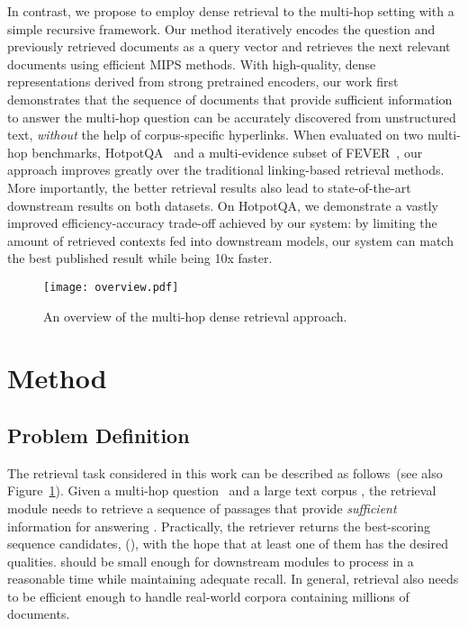 \documentclass{article} \usepackage{iclr2021_conference,times}
\begin{document}
In contrast, we propose to employ dense retrieval to the multi-hop setting with a simple recursive framework.
Our method iteratively encodes the question and previously retrieved documents as a query vector and retrieves the next relevant documents using efficient MIPS methods. 
With high-quality, dense representations derived from strong pretrained encoders, our work first demonstrates that the sequence of documents that provide sufficient information to answer the multi-hop question can be 
accurately discovered from unstructured text, \emph{without} the help of corpus-specific hyperlinks. 
When evaluated on two multi-hop benchmarks, HotpotQA~\citep{HotpotQA} and a multi-evidence subset of FEVER~\citep{FEVER}, our approach improves greatly over the traditional linking-based retrieval methods. More importantly, the better retrieval results also lead to state-of-the-art downstream results on both datasets. On HotpotQA, we demonstrate a vastly improved efficiency-accuracy trade-off achieved by our system: by limiting the amount of retrieved contexts fed into downstream models, our system can match the best published result while being 10x faster.



\begin{figure}[t]
\vspace{-0.2in}
\texttt{[image: overview.pdf]}
\vspace{-0.2in}
 \caption{An overview of the multi-hop dense retrieval approach.}
\vspace{-0.2in}
\label{fig:example}
\end{figure}



\section{Method}

\subsection{Problem Definition} 






The retrieval task considered in this work can be described as follows~(see also Figure~\ref{fig:example}). 
Given a multi-hop question~ and a large text corpus , the retrieval module needs to retrieve a sequence of passages  that provide \emph{sufficient} information for answering .  
Practically, the retriever returns the  best-scoring sequence candidates,  (), with the hope that at least one of them has the desired qualities. 
 should be small enough for downstream modules to process in a reasonable time while maintaining adequate recall.
In general, retrieval also needs to be efficient enough to handle real-world corpora containing millions of documents.
\end{document}
